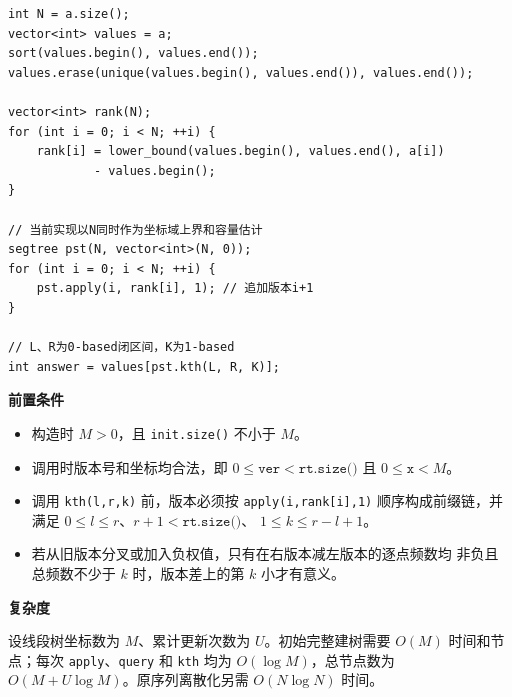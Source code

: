 \begin{verbatim}
int N = a.size();
vector<int> values = a;
sort(values.begin(), values.end());
values.erase(unique(values.begin(), values.end()), values.end());

vector<int> rank(N);
for (int i = 0; i < N; ++i) {
    rank[i] = lower_bound(values.begin(), values.end(), a[i])
            - values.begin();
}

// 当前实现以N同时作为坐标域上界和容量估计
segtree pst(N, vector<int>(N, 0));
for (int i = 0; i < N; ++i) {
    pst.apply(i, rank[i], 1); // 追加版本i+1
}

// L、R为0-based闭区间，K为1-based
int answer = values[pst.kth(L, R, K)];
\end{verbatim}

\textbf{前置条件}

\begin{itemize}
  \item 构造时 $M>0$，且 \texttt{init.size()} 不小于 $M$。
  \item 调用时版本号和坐标均合法，即
        $0\le\texttt{ver}<\texttt{rt.size()}$ 且
        $0\le\texttt{x}<M$。
  \item 调用 \texttt{kth(l,r,k)} 前，版本必须按
        \texttt{apply(i,rank[i],1)} 顺序构成前缀链，并满足
        $0\le l\le r$、$r+1<\texttt{rt.size()}$、
        $1\le k\le r-l+1$。
  \item 若从旧版本分叉或加入负权值，只有在右版本减左版本的逐点频数均
        非负且总频数不少于 $k$ 时，版本差上的第 $k$ 小才有意义。
\end{itemize}

\textbf{复杂度}

设线段树坐标数为 $M$、累计更新次数为 $U$。初始完整建树需要
$O(M)$ 时间和节点；每次 \texttt{apply}、\texttt{query} 和
\texttt{kth} 均为 $O(\log M)$，总节点数为
$O(M+U\log M)$。原序列离散化另需 $O(N\log N)$ 时间。
